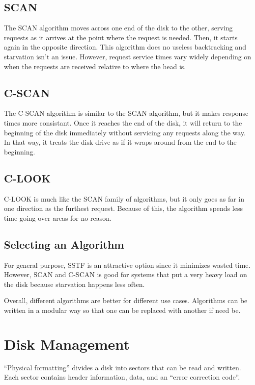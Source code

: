 \documentclass{article}
\begin{document}
\subsection{SCAN}
The SCAN algorithm moves across one end of the disk to the other, serving
requests as it arrives at the point where the request is needed. Then, it starts
again in the opposite direction. This algorithm does no useless backtracking
and starvation isn't an issue. However, request service times vary widely
depending on when the requests are received relative to where the head is.

\subsection{C-SCAN}
The C-SCAN algorithm is similar to the SCAN algorithm, but it makes response
times more consistant. Once it reaches the end of the disk, it will return
to the beginning of the disk immediately without servicing any requests along
the way. In that way, it treats the disk drive as if it wraps around from the
end to the beginning.

\subsection{C-LOOK}
C-LOOK is much like the SCAN family of algorithms, but it only goes as far
in one direction as the furthest request. Because of this, the algorithm spends
less time going over areas for no reason.

\subsection{Selecting an Algorithm}
For general purpose, SSTF is an attractive option since it minimizes wasted
time. However, SCAN and C-SCAN is good for systems that put a very heavy load
on the disk because starvation happens less often.

Overall, different algorithms are better for different use cases. Algorithms
can be written in a modular way so that one can be replaced with another if
need be.

\section{Disk Management}
``Physical formatting'' divides a disk into sectors that can be read and
written. Each sector contains header information, data, and an ``error
correction code''.
\end{document}
